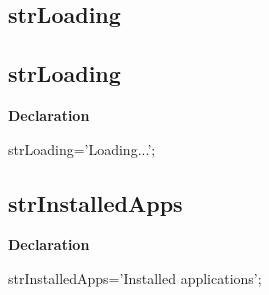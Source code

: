 \documentclass{report}
\newif\ifpdf
\begin{document}
\subsection*{\large{\textbf{strLoading}}\normalsize\hspace{1ex}\hrulefill}
\else
\subsection*{strLoading}
\fi
\label{trstrings-strLoading}
\begin{list}{}{
\setlength{\itemindent}{0cm}
\setlength{\listparindent}{0cm}
\setlength{\leftmargin}{\evensidemargin}
\addtolength{\leftmargin}{\tmplength}
\settowidth{\labelsep}{X}
\addtolength{\leftmargin}{\labelsep}
\setlength{\labelwidth}{\tmplength}
}
\item[\textbf{Declaration}\hfill]
\ifpdf
\begin{flushleft}
\fi
\begin{ttfamily}
strLoading='Loading...';\end{ttfamily}

\ifpdf
\end{flushleft}
\fi

\end{list}
\ifpdf
\subsection*{\large{\textbf{strInstalledApps}}\normalsize\hspace{1ex}\hrulefill}
\else
\subsection*{strInstalledApps}
\fi
\label{trstrings-strInstalledApps}
\begin{list}{}{
\setlength{\itemindent}{0cm}
\setlength{\listparindent}{0cm}
\setlength{\leftmargin}{\evensidemargin}
\addtolength{\leftmargin}{\tmplength}
\settowidth{\labelsep}{X}
\addtolength{\leftmargin}{\labelsep}
\setlength{\labelwidth}{\tmplength}
}
\item[\textbf{Declaration}\hfill]
\ifpdf
\begin{flushleft}
\fi
\begin{ttfamily}
strInstalledApps='Installed applications';\end{ttfamily}

\ifpdf
\end{flushleft}
\fi

\end{list}
\ifpdf
\end{document}
